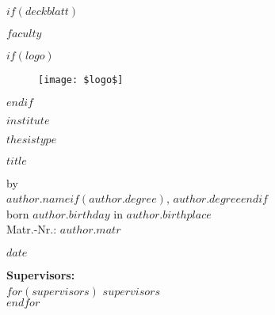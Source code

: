 \documentclass[oneside,12pt,a4paper,bibliography=totoc,numbers=noenddot,table]{scrreprt} %
\begin{document}

$if(deckblatt)$
\begin{titlepage}
\thispagestyle{empty}
\begin{center}

\begin{large}
\textsf{\textbf{$faculty$}}\\
\end{large}

\vfill

$if(logo)$
\begin{figure}[h!]
    \centering
    \texttt{[image: \$logo\$]}
\end{figure}
$endif$

\vfill

\begin{large}
\textsf{\textbf{$institute$}}\\
\end{large}

\vfill

\begin{Large}
    \textsf{\textbf{$thesistype$}}\\
\end{Large}

\vfill

\begin{LARGE}
    \textsf{\textbf{$title$}}\\ %
\end{LARGE}

\vfill

\begin{large}
    \textsf{by}\\[0.5em]
    \textsf{\textbf{$author.name$}$if(author.degree)$, $author.degree$$endif$}\\[0.5em]
    \textsf{born $author.birthday$ in $author.birthplace$}\\[0.5em]
    \textsf{Matr.-Nr.: $author.matr$}\\

    \vfill

    \textsf{$date$}

    \vfill

    \textsf{\textbf{Supervisors:}}\\[1em]
    $for(supervisors)$
    \textsf{$supervisors$}\\[0.5em]
    $endfor$
\end{large}

\end{center}

\end{titlepage}
\thispagestyle{empty}
\cleardoublepage
\end{document}
